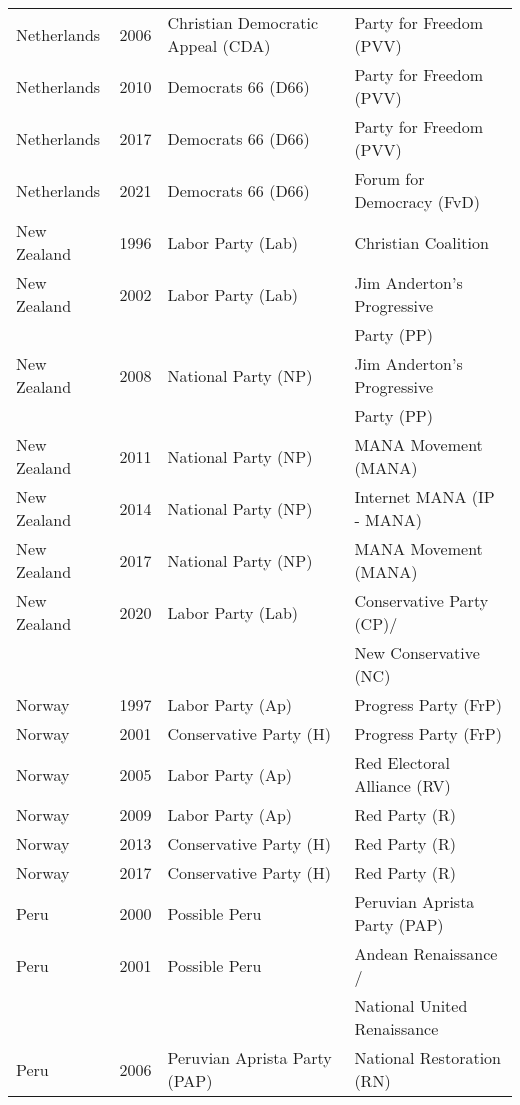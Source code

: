 {\begin{longtable}{|l|c|l|l|}
Netherlands & 2006 &   Christian Democratic Appeal (CDA)   &   Party for Freedom (PVV) \\ 
Netherlands & 2010 &   Democrats 66 (D66) &   Party for Freedom (PVV) \\ 
Netherlands & 2017 &   Democrats 66 (D66) &   Party for Freedom (PVV) \\ 
Netherlands & 2021 &   Democrats 66 (D66) &   Forum for Democracy (FvD) \\ 
New Zealand & 1996 &   Labor Party (Lab) &   Christian Coalition \\ 
New Zealand & 2002 &   Labor Party (Lab) &   Jim Anderton's Progressive   \\ 
               &      &         &    Party (PP)  \\ 
New Zealand & 2008 &   National Party (NP) &   Jim Anderton's Progressive  \\ 
               &      &         &   Party (PP)    \\ 
New Zealand & 2011 &   National Party (NP) &   MANA Movement (MANA) \\ 
New Zealand & 2014 &   National Party (NP) &   Internet MANA (IP - MANA)   \\ 
New Zealand & 2017 &   National Party (NP) &   MANA Movement (MANA) \\ 
New Zealand & 2020 &   Labor Party (Lab) &   Conservative Party (CP)/   \\ 
               &      &         &    New Conservative (NC) \\ 
Norway & 1997 &   Labor Party (Ap)   &   Progress Party (FrP) \\ 
Norway & 2001 &   Conservative Party (H) &   Progress Party (FrP) \\ 
Norway & 2005 &   Labor Party (Ap)   &   Red Electoral Alliance (RV) \\ 
Norway & 2009 &   Labor Party (Ap)   &   Red Party (R)   \\ 
Norway & 2013 &   Conservative Party (H) &   Red Party (R)   \\ 
Norway & 2017 &   Conservative Party (H) &   Red Party (R)   \\ 
Peru & 2000 &   Possible Peru   &   Peruvian Aprista Party (PAP)   \\ 
Peru & 2001 &   Possible Peru   &   Andean Renaissance / \\ 
               &      &         &    National United Renaissance    \\ 
Peru & 2006 &   Peruvian Aprista Party (PAP)   &   National Restoration (RN) \\ 

\end{longtable}}
